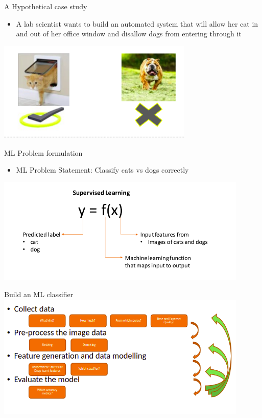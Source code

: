 \documentclass[aspectratio=169,14pt,usenames,dvipsnames]{beamer}
\begin{document}
\begin{frame}[t]{A Hypothetical case study}
\begin{itemize}
  \item A lab scientist wants to build an automated system that will allow her cat in and out of her office window and disallow dogs from entering through it
\end{itemize}
\centering
\includegraphics[width=0.7\textwidth, height=0.5\textheight]{Images/AIML_MLPrinciples_IMG3.png}
\end{frame}

\begin{frame}[t]{ML Problem formulation}
\begin{itemize}
\item ML Problem Statement: Classify cats vs dogs correctly
\end{itemize}
\includegraphics[width=0.9\textwidth, height=0.6\textheight]{Images/AIML_MLPrinciples_IMG13.png}
\end{frame}

\begin{frame}[t]{Build an ML classifier}
\centering
\includegraphics[width=0.9\textwidth, height=0.6\textheight]{Images/AIML_MLPrinciples_IMG4.png}
\end{frame}
\end{document}
